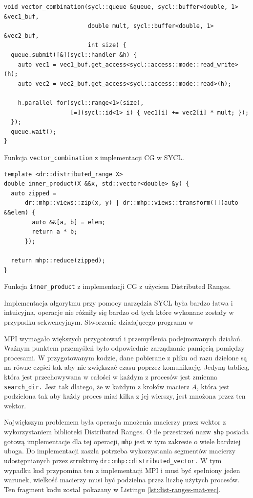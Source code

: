 \documentclass[a4paper,12pt]{book} %
\begin{document}
\begin{lstfloat}
\lstset{language=C++}
\begin{lstlisting}[frame=single]
	void vector_combination(sycl::queue &queue, sycl::buffer<double, 1> &vec1_buf,
                        double mult, sycl::buffer<double, 1> &vec2_buf,
                        int size) {
  queue.submit([&](sycl::handler &h) {
    auto vec1 = vec1_buf.get_access<sycl::access::mode::read_write>(h);
    auto vec2 = vec2_buf.get_access<sycl::access::mode::read>(h);

    h.parallel_for(sycl::range<1>(size),
                   [=](sycl::id<1> i) { vec1[i] += vec2[i] * mult; });
  });
  queue.wait();
}
\end{lstlisting}
\caption{Funkcja \texttt{vector\_combination} z implementacji CG w SYCL.}
\label{lst:vector-combination}
\end{lstfloat}

\begin{lstfloat}
\lstset{language=C++}
\begin{lstlisting}[frame=single]
template <dr::distributed_range X>
double inner_product(X &&x, std::vector<double> &y) {
  auto zipped =
      dr::mhp::views::zip(x, y) | dr::mhp::views::transform([](auto &&elem) {
        auto &&[a, b] = elem;
        return a * b;
      });

  return mhp::reduce(zipped);
}
\end{lstlisting}
\caption{Funkcja \texttt{inner\_product} z implementacji CG z użyciem Distributed Ranges.}
\label{lst:inner-product}
\end{lstfloat}

Implementacja algorytmu przy pomocy narzędzia SYCL była bardzo łatwa i intuicyjna, operacje nie różniły się bardzo od tych które wykonane zostały w przypadku sekwencyjnym. Stworzenie działającego programu w 

MPI wymagało większych przygotowań i przemyślenia podejmowanych działań. Ważnym punktem przemyśleń było odpowiednie zarządzanie pamięcią pomiędzy procesami. W przygotowanym kodzie, dane pobierane z pliku od razu dzielone są na równe części tak aby nie zwiększać czasu poprzez komunikację. Jedyną tablicą, która jest przechowywana w całości w każdym z procesów jest zmienna \texttt{search\_dir.} Jest tak dlatego, że w każdym z kroków macierz $A$, która jest podzielona tak aby każdy proces miał kilka z jej wierszy, jest mnożona przez ten wektor.

Największym problemem była operacja mnożenia macierzy przez wektor z wykorzystaniem biblioteki Distributed Ranges. O ile przestrzeń nazw \texttt{shp} posiada gotową implementacje dla tej operacji, \texttt{mhp} jest w tym zakresie o wiele bardziej uboga. Do implementacji zaszła potrzeba wykorzystania segmentów macierzy udostępnianych przez strukturę \texttt{dr::mhp::distributed\_vector.} W tym wypadku kod przypomina ten z implementacji MPI i musi być spełniony jeden warunek, wielkość macierzy musi być podzielna przez liczbę użytych procesów. Ten fragment kodu został pokazany w Listingu \ref{lst:dist-ranges-mat-vec}.
\end{document}
